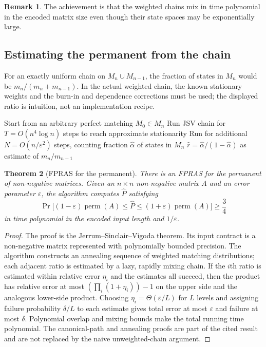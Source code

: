 \documentclass[twoside,12pt]{book}
\theoremstyle{plain}
\newtheorem{theorem}{Theorem}[chapter]
\theoremstyle{definition}
\newtheorem{remark}[theorem]{Remark}
\theoremstyle{remark}
\begin{document}
\begin{remark}
The achievement is that the weighted chains mix in time polynomial in the
encoded matrix size even though their state spaces may be exponentially large.
\end{remark}

\subsection{Estimating the permanent from the chain}

For an exactly uniform chain on $M_n\cup M_{n-1}$, the fraction of states in
$M_n$ would be $m_n/(m_n+m_{n-1})$. In the actual weighted chain, the known
stationary weights and the burn-in and dependence corrections must be used;
the displayed ratio is intuition, not an implementation recipe.

\begin{algorithm}
\caption{Karp--Luby Estimation of $m_n / m_{n-1}$}
\label{alg:perm-ratio}
\begin{algorithmic}[1]
    \State Start from an arbitrary perfect matching $M_0 \in M_n$ 
    \State Run JSV chain for $T = O(n^4 \log n)$ steps to reach approximate stationarity
    \State Run for additional $N = O(n/\varepsilon^2)$ steps, counting fraction $\hat{\alpha}$ of states in $M_n$
    \State \Return $\hat{r} = \hat{\alpha} / (1 - \hat{\alpha})$ as estimate of $m_n / m_{n-1}$
\EndFunction
\end{algorithmic}
\end{algorithm}

\begin{theorem}[FPRAS for the permanent]
\label{thm:perm-fpras}
There is an FPRAS for the permanent of non-negative matrices. Given an
$n \times n$ non-negative matrix $A$ and an error parameter $\varepsilon$,
the algorithm computes $\hat{P}$ satisfying
\[
\Pr\!\bigl[(1 - \varepsilon) \operatorname{perm}(A) \leq \hat{P} \leq (1 + \varepsilon) \operatorname{perm}(A)\bigr] \geq \frac{3}{4}
\]
in time polynomial in the encoded input length and $1/\varepsilon$.
\end{theorem}

\begin{proof}
The proof is the Jerrum--Sinclair--Vigoda theorem. Its input contract is a
non-negative matrix represented with polynomially bounded precision. The
algorithm constructs an annealing sequence of weighted matching distributions;
each adjacent ratio is estimated by a lazy, rapidly mixing chain. If the $i$th
ratio is estimated within relative error $\eta_i$ and the estimates all
succeed, then the product has relative error at most
$(\prod_i(1+\eta_i))-1$ on the upper side and the analogous lower-side product.
Choosing $\eta_i=\Theta(\varepsilon/L)$ for $L$ levels and assigning failure
probability $\delta/L$ to each estimate gives total error at most
$\varepsilon$ and failure at most $\delta$. Polynomial overlap and mixing
bounds make the total running time polynomial. The canonical-path and
annealing proofs are part of the cited result and are not replaced by the
naive unweighted-chain argument.
\end{proof}
\end{document}

